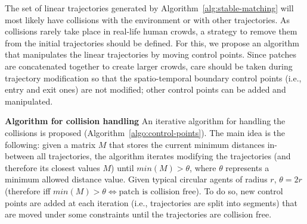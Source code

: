 
The set of linear trajectories generated by Algorithm~\ref{alg:stable-matching} will most likely have collisions with the environment or with other trajectories. As collisions rarely take place in real-life human crowds, a strategy to remove them from the initial trajectories should be defined. For this, we propose an algorithm that manipulates the linear trajectories by moving control points.
Since patches are concatenated together to create larger crowds, care should be taken during trajectory modification so that the spatio-temporal boundary control points (i.e., entry and exit ones) are not modified; other control points can be added and manipulated.


\textbf{Algorithm for collision handling} An iterative algorithm for handling the collisions is proposed (Algorithm~\ref{algo:control-points}).
The main idea is the following: given a matrix $M$ that stores the current minimum distances in-between all trajectories, the algorithm iterates modifying the trajectories (and therefore its closest values $M$) until $min(M) > \theta$, where $\theta$ represents a minimum allowed distance value.
Given typical circular agents of radius $r$, $\theta = 2r$ (therefore iff $min(M) > \theta \Leftrightarrow \text{patch is collision free}$).
To do so, new control points are added at each iteration (i.e., trajectories are split into segments) that are moved under some constraints until the trajectories are collision free.

